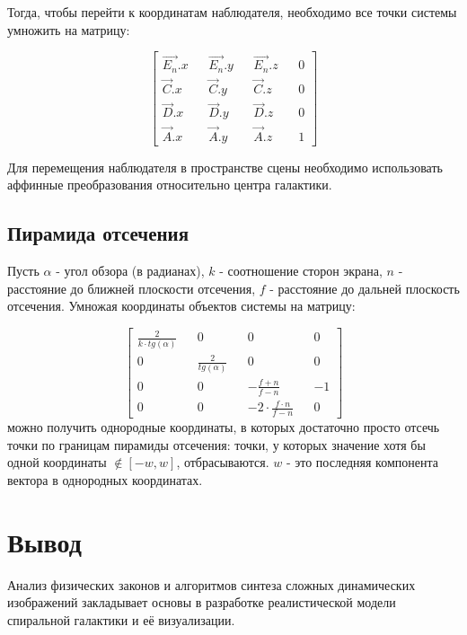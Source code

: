 Тогда, чтобы перейти к координатам наблюдателя, необходимо все точки системы умножить на матрицу:

\begin{equation}
	\begin{bmatrix}
		\vec{E_n}.x && \vec{E_n}.y && \vec{E_n}.z && 0 \\
		\vec{C}.x  &&  \vec{C}.y  &&  \vec{C}.z  &&  0 \\
		\vec{D}.x  &&  \vec{D}.y  &&  \vec{D}.z  &&  0 \\
		\vec{A}.x  &&  \vec{A}.y  &&  \vec{A}.z  &&  1
	\end{bmatrix}
\end{equation}

Для перемещения наблюдателя в пространстве сцены необходимо использовать аффинные преобразования относительно центра галактики.

\subsection{Пирамида отсечения}

Пусть $\alpha{}$ - угол обзора (в радианах), $k$ - соотношение сторон экрана, $n$ - расстояние до ближней плоскости отсечения, $f$ - расстояние до дальней плоскость отсечения. Умножая координаты объектов системы на матрицу:

\begin{equation}
	\begin{bmatrix}
		\frac{2}{k \cdot{} tg(\alpha{})} && 0 && 0 && 0 \\
		0 && \frac{2}{tg(\alpha{})} && 0 && 0 \\
		0 && 0 && -\frac{f + n}{f - n} && -1 \\
		0 && 0 && -2\cdot{}\frac{f\cdot{}n}{f - n} && 0
	\end{bmatrix}
\end{equation}
можно получить однородные координаты, в которых достаточно просто отсечь точки по границам пирамиды отсечения: точки, у которых значение хотя бы одной координаты $\notin [-w, w]$, отбрасываются. $w$ - это последняя компонента вектора в однородных координатах.

\section{Вывод}
Анализ физических законов и алгоритмов синтеза сложных динамических изображений закладывает основы в разработке реалистической модели спиральной галактики и её визуализации.

